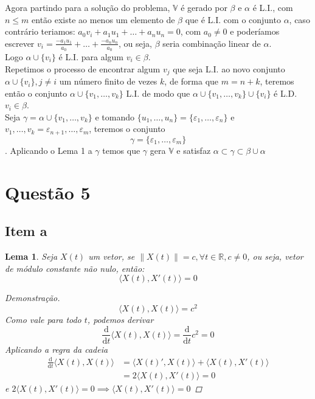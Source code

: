 \documentclass[12pt,letterpaper]{article}
\newtheorem{lemma}{Lema}
\begin{document}
  Agora partindo para a solução do problema, \(\mathbb{V}\) é gerado por \(\beta\) e \(\alpha\) é L.I., com \(n \leq m\) então existe ao menos um elemento de \(\beta\) que é L.I. com o conjunto \(\alpha\), caso contrário teriamos:  \(a_0v_i + a_1u_1 + \dots + a_nu_n = 0\), com \(a_0 \neq 0\) e poderíamos escrever \(v_i = \frac{-a_1u_1}{a_0} + \dots + \frac{-a_nu_n}{a_0}\), ou seja, \( \beta \) seria combinação linear de \(\alpha\).\\
  Logo \(\alpha \cup \{v_i\}\) é L.I. para algum \(v_i \in \beta\).\\
  Repetimos o processo de encontrar algum \(v_j\) que seja L.I. ao novo conjunto  \(\alpha \cup \{v_i\}, j \neq i\) um número finito de vezes \(k\), de forma que \(m = n + k\), teremos então o conjunto \(\alpha \cup \{v_1, \dots, v_k\}\) L.I. de modo que \(\alpha \cup \{v_1, \dots, v_k\} \cup \{v_i\}\) é L.D. \forall \(v_i \in \beta\).\\
  Seja \(\gamma = \alpha \cup \{v_1, \dots, v_k\} \) e tomando \(\{u_1,\dots, u_n\} = \{\varepsilon_1, \dots, \varepsilon_n\}\) e \(v_1, \dots, v_k = \varepsilon_{n+1}, \dots, \varepsilon_m\), teremos o conjunto \[\gamma = \{\varepsilon_1, \dots, \varepsilon_m\}\].
  Aplicando o Lema 1 a \(\gamma\) temos que \(\gamma\) gera \(\mathbb{V}\) e satisfaz \(\alpha \subset \gamma \subset \beta \cup \alpha \)

\newpage
\section*{Questão 5}
\subsection*{Item a}
\begin{lemma}
Seja \(X(t)\) um vetor, se \(\lVert X(t) \rVert = c, \forall t \in \mathbb{R}, c\neq 0\), ou seja, vetor de módulo constante não nulo, então:
\[\langle X(t), X'(t) \rangle = 0\]
\begin{proof}[Demonstração]
\[\langle X(t), X(t) \rangle = c^2\]
Como vale para todo \(t\), podemos derivar
\[ \frac{\mathrm{d}}{\mathrm{d}t}\langle X(t), X(t) \rangle = \frac{\mathrm{d}}{\mathrm{d}t}c^2 = 0 \]
Aplicando a regra da cadeia
\begin{align*}
  \frac{\mathrm{d}}{\mathrm{d}t} \langle X(t), X(t) \rangle &=  \langle X(t)', X(t) \rangle + \langle X(t), X'(t) \rangle \\
  &= 2 \langle X(t), X'(t) \rangle = 0
\end{align*}
e \(2 \langle X(t), X'(t) \rangle = 0 \implies \langle X(t), X'(t) \rangle = 0\)
\end{proof}
\end{lemma}
\end{document}
